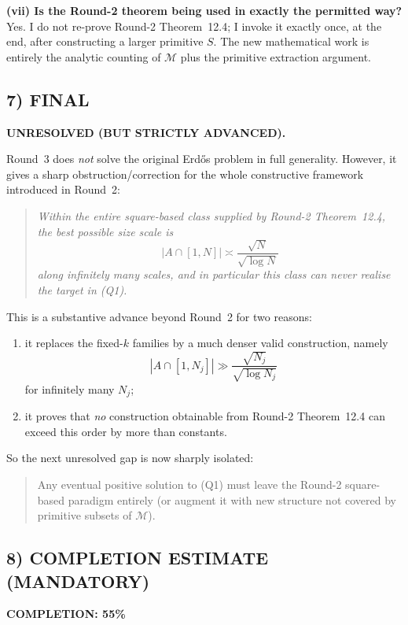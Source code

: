 \textbf{(vii) Is the Round-2 theorem being used in exactly the permitted way?}
Yes. I do not re-prove Round-2 Theorem~12.4; I invoke it exactly once, at the end, after constructing a larger primitive $S$.
The new mathematical work is entirely the analytic counting of $\mathcal M$ plus the primitive extraction argument.

\subsection*{7) FINAL}

\textbf{UNRESOLVED (BUT STRICTLY ADVANCED).}

Round~3 does \emph{not} solve the original Erd\H{o}s problem in full generality.
However, it gives a sharp obstruction/correction for the whole constructive framework introduced in Round~2:

\begin{quote}
\emph{Within the entire square-based class supplied by Round-2 Theorem~12.4, the best possible size scale is}
\[
|A\cap[1,N]|\asymp \frac{\sqrt N}{\sqrt{\log N}}
\]
\emph{along infinitely many scales, and in particular this class can never realise the target in (Q1).}
\end{quote}

This is a substantive advance beyond Round~2 for two reasons:
\begin{enumerate}
\item it replaces the fixed-$k$ families by a much denser valid construction, namely
\[
|A\cap[1,N_j]|\gg \frac{\sqrt{N_j}}{\sqrt{\log N_j}}
\]
for infinitely many $N_j$;
\item it proves that \emph{no} construction obtainable from Round-2 Theorem~12.4 can exceed this order by more than constants.
\end{enumerate}

So the next unresolved gap is now sharply isolated:

\begin{quote}
Any eventual positive solution to \textnormal{(Q1)} must leave the Round-2 square-based paradigm entirely (or augment it with new structure not covered by primitive subsets of $\mathcal M$).
\end{quote}

\subsection*{8) COMPLETION ESTIMATE (MANDATORY)}

\noindent\textbf{COMPLETION: 55\%}

